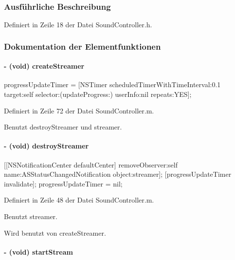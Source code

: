 \subsubsection{Ausführliche Beschreibung}


Definiert in Zeile 18 der Datei SoundController.h.

\subsubsection{Dokumentation der Elementfunktionen}
\hypertarget{interface_sound_controller_a013cdcefe5418a9bcd7efbefb7f954a9}{
\paragraph[{createStreamer}]{\setlength{\rightskip}{0pt plus 5cm}-\/ (void) createStreamer }\hfill}
\label{interface_sound_controller_a013cdcefe5418a9bcd7efbefb7f954a9}


progressUpdateTimer = \mbox{[}NSTimer scheduledTimerWithTimeInterval:0.1 target:self selector:(updateProgress:) userInfo:nil repeats:YES\mbox{]};

Definiert in Zeile 72 der Datei SoundController.m.

Benutzt destroyStreamer und streamer.\hypertarget{interface_sound_controller_ae9f575ccb48dda60213d90afb965f13c}{
\paragraph[{destroyStreamer}]{\setlength{\rightskip}{0pt plus 5cm}-\/ (void) destroyStreamer }\hfill}
\label{interface_sound_controller_ae9f575ccb48dda60213d90afb965f13c}


\mbox{[}\mbox{[}NSNotificationCenter defaultCenter\mbox{]} removeObserver:self name:ASStatusChangedNotification object:streamer\mbox{]}; \mbox{[}progressUpdateTimer invalidate\mbox{]}; progressUpdateTimer = nil;

Definiert in Zeile 48 der Datei SoundController.m.

Benutzt streamer.

Wird benutzt von createStreamer.\hypertarget{interface_sound_controller_a8f28bc622fc0b8aae6d7303dfb05aa6e}{
\paragraph[{startStream}]{\setlength{\rightskip}{0pt plus 5cm}-\/ (void) startStream }\hfill}
\label{interface_sound_controller_a8f28bc622fc0b8aae6d7303dfb05aa6e}


